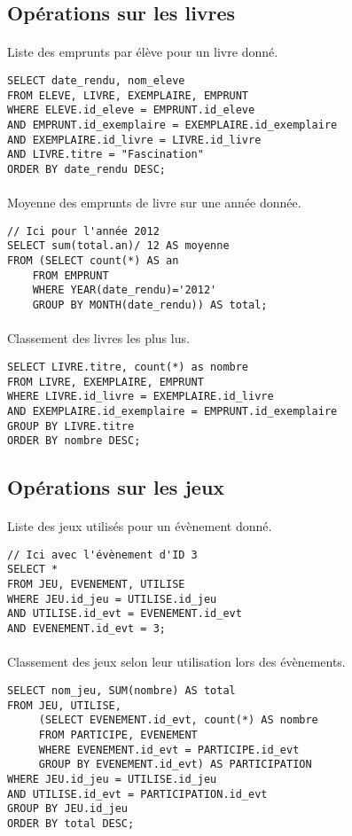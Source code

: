 \documentclass[a4paper, 11pt]{article}
\begin{document}
\subsection{Opérations sur les livres}
\paragraph{}
Liste des emprunts par élève pour un livre donné.
\begin{verbatim}
SELECT date_rendu, nom_eleve  
FROM ELEVE, LIVRE, EXEMPLAIRE, EMPRUNT  
WHERE ELEVE.id_eleve = EMPRUNT.id_eleve  
AND EMPRUNT.id_exemplaire = EXEMPLAIRE.id_exemplaire  
AND EXEMPLAIRE.id_livre = LIVRE.id_livre  
AND LIVRE.titre = "Fascination" 
ORDER BY date_rendu DESC;
\end{verbatim}
\paragraph{}
Moyenne des emprunts de livre sur une année donnée.
\begin{verbatim}
// Ici pour l'année 2012
SELECT sum(total.an)/ 12 AS moyenne 
FROM (SELECT count(*) AS an 
    FROM EMPRUNT 
    WHERE YEAR(date_rendu)='2012' 
    GROUP BY MONTH(date_rendu)) AS total;
\end{verbatim}
\paragraph{}
Classement des livres les plus lus.
\begin{verbatim}
SELECT LIVRE.titre, count(*) as nombre 
FROM LIVRE, EXEMPLAIRE, EMPRUNT 
WHERE LIVRE.id_livre = EXEMPLAIRE.id_livre 
AND EXEMPLAIRE.id_exemplaire = EMPRUNT.id_exemplaire 
GROUP BY LIVRE.titre 
ORDER BY nombre DESC;
\end{verbatim}
\subsection{Opérations sur les jeux}
\paragraph{}
Liste des jeux utilisés pour un évènement donné.
\begin{verbatim}
// Ici avec l'évènement d'ID 3
SELECT *
FROM JEU, EVENEMENT, UTILISE
WHERE JEU.id_jeu = UTILISE.id_jeu
AND UTILISE.id_evt = EVENEMENT.id_evt
AND EVENEMENT.id_evt = 3;
\end{verbatim}
\paragraph{}
Classement des jeux selon leur utilisation lors des évènements.
\begin{verbatim}
SELECT nom_jeu, SUM(nombre) AS total
FROM JEU, UTILISE, 
     (SELECT EVENEMENT.id_evt, count(*) AS nombre 
     FROM PARTICIPE, EVENEMENT 
     WHERE EVENEMENT.id_evt = PARTICIPE.id_evt 
     GROUP BY EVENEMENT.id_evt) AS PARTICIPATION
WHERE JEU.id_jeu = UTILISE.id_jeu
AND UTILISE.id_evt = PARTICIPATION.id_evt
GROUP BY JEU.id_jeu
ORDER BY total DESC;
\end{verbatim}
\end{document}

